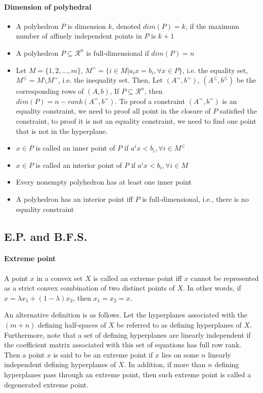             \paragraph{Dimension of polyhedral}
                \begin{itemize}
                    \item A polyhedron $P$ is dimension $k$, denoted $dim(P)=k$, if the maximum number of affinely independent points in $P$ is $k+1$
                    \item A polyhedron $P\subseteq \mathcal{R}^n$ is full-dimensional if $dim(P) = n$
                    \item Let $M=\{1, 2, ..., m\}$, $M^= = \{i \in M | a_ix=b_i, \forall x \in P\}$, i.e. the equality set, $M^\le = M \setminus  M^=$, i.e. the inequality set. Then, Let $(A^=, b^=)$, $(A^\le, b^\le)$ be the corresponding rows of $(A, b)$, If $P\subseteq \mathcal{R}^n$, then $dim(P) = n - rank(A^=, b^=)$. To proof a constraint $(A^=, b^=)$ is an equality constraint, we need to proof all point in the closure of $P$ satisfied the constraint, to proof it is not an equality constraint, we need to find one point that is not in the hyperplane.
                    \item $x\in P$ is called an inner point of $P$ if $a^ix < b_i, \forall i \in M^\le$
                    \item $x\in P$ is called an interior point of $P$ if $a^ix < b_i, \forall i \in M$
                    \item Every nonempty polyhedron has at least one inner point
                    \item A polyhedron has an interior point iff $P$ is full-dimensional, i.e., there is no equality constraint
                \end{itemize}

        \subsection{E.P. and B.F.S.}
            \paragraph{Extreme point}
                A point $x$ in a convex set $X$ is called an extreme point iff $x$ cannot be represented as a strict convex combination of two distinct points of $X$. In other words, if $x = \lambda x_1 + (1 - \lambda) x_2$, then $x_1 = x_2 = x$.

                An alternative definition is as follows. Let the hyperplanes associated with the $(m + n)$ defining half-spaces of $X$ be referred to as defining hyperplanes of $X$. Furthermore, note that a set of defining hyperplanes are linearly independent if the coefficient matrix associated with this set of equations has full row rank. Then a point $x$ is said to be an extreme point if $x$ lies on some $n$ linearly independent defining hyperplanes of $X$. In addition, if more than $n$ defining hyperplanes pass through an extreme point, then such extreme point is called a degenerated extreme point.

